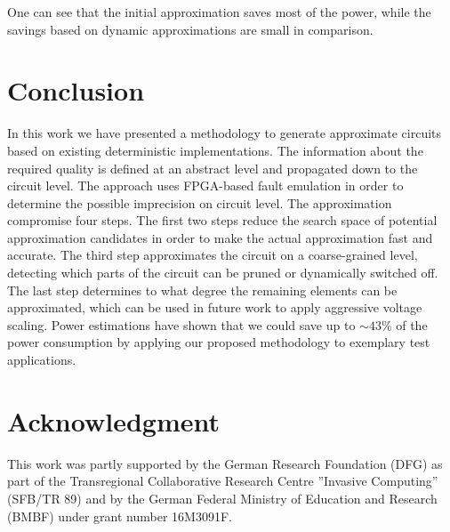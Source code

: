 \documentclass[10pt,twocolumn]{IEEEtran} %
\begin{document}
One can see that the initial approximation saves most of the power, while the savings based on dynamic approximations are small in comparison. 

\section{\bf{Conclusion}}
\label{sec:conclusion}
In this work we have presented a methodology to generate approximate circuits based on existing deterministic implementations. The information about the required quality is defined at an abstract level and propagated down to the circuit level. The approach uses FPGA-based fault emulation in order to determine the possible imprecision on circuit level. The approximation compromise four steps. The first two steps reduce the search space of potential approximation candidates in order to make the actual approximation fast and accurate. The third step approximates the circuit on a coarse-grained level, detecting which parts of the circuit can be pruned or dynamically switched off. The last step determines to what degree the remaining elements can be approximated, which can be used in future work to apply aggressive voltage scaling. Power estimations have shown that we could save up to $\sim43\%$ of the power consumption by applying our proposed methodology to exemplary test applications.





\section*{\bf{Acknowledgment}}
This work was partly supported by the German Research Foundation (DFG) as part of the Transregional Collaborative Research Centre ”Invasive Computing” (SFB/TR 89) and by the German Federal Ministry of Education and Research (BMBF) under grant number 16M3091F.

\nocite{*}
%


\end{document}
